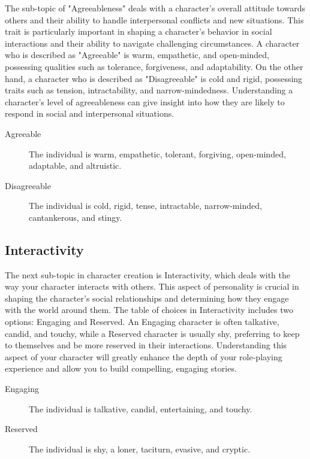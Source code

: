 The sub-topic of "Agreeableness" deals with a character's overall attitude towards others and their ability to handle interpersonal conflicts and new situations. This trait is particularly important in shaping a character's behavior in social interactions and their ability to navigate challenging circumstances. A character who is described as "Agreeable" is warm, empathetic, and open-minded, possessing qualities such as tolerance, forgiveness, and adaptability. On the other hand, a character who is described as "Disagreeable" is cold and rigid, possessing traits such as tension, intractability, and narrow-mindedness. Understanding a character's level of agreeableness can give insight into how they are likely to respond in social and interpersonal situations.

\begin{description}
    \item[Agreeable] The individual is warm, empathetic, tolerant, forgiving, open-minded, adaptable, and altruistic.
    \item[Disagreeable] The individual is cold, rigid, tense, intractable, narrow-minded, cantankerous, and stingy.
\end{description}

\subsection{\textbf{Interactivity}}

The next sub-topic in character creation is Interactivity, which deals with the way your character interacts with others. This aspect of personality is crucial in shaping the character's social relationships and determining how they engage with the world around them. The table of choices in Interactivity includes two options: Engaging and Reserved. An Engaging character is often talkative, candid, and touchy, while a Reserved character is usually shy, preferring to keep to themselves and be more reserved in their interactions. Understanding this aspect of your character will greatly enhance the depth of your role-playing experience and allow you to build compelling, engaging stories.

\begin{description}
    \item[Engaging] The individual is talkative, candid, entertaining, and touchy.
    \item[Reserved] The individual is shy, a loner, taciturn, evasive, and cryptic.
\end{description}

